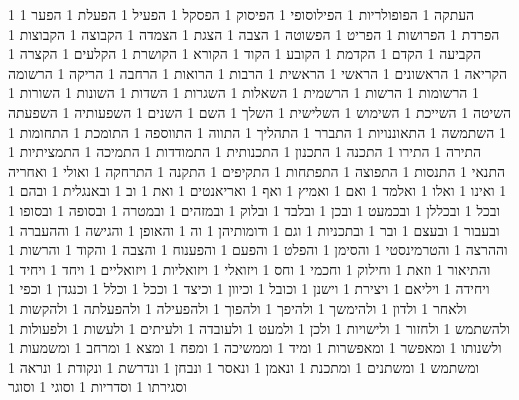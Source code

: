       1 העתקה
      1 הפופולריות
      1 הפילוסופי
      1 הפיסוק
      1 הפסקל
      1 הפעיל
      1 הפעלת
      1 הפער
      1 הפרדת
      1 הפרושות
      1 הפריט
      1 הפשוטה
      1 הצבה
      1 הצגת
      1 הצמדה
      1 הקבוצה
      1 הקבוצות
      1 הקביעה
      1 הקדם
      1 הקדמת
      1 הקובע
      1 הקוד
      1 הקורא
      1 הקושרת
      1 הקלעים
      1 הקצרה
      1 הקריאה
      1 הראשונים
      1 הראשי
      1 הראשית
      1 הרבות
      1 הרואות
      1 הרחבה
      1 הריקה
      1 הרשומה
      1 הרשומות
      1 הרשות
      1 הרשמית
      1 השאלות
      1 השגרות
      1 השדות
      1 השונות
      1 השורות
      1 השיטה
      1 השייכת
      1 השימוש
      1 השלישית
      1 השלך
      1 השם
      1 השנים
      1 השפעותיה
      1 השפעתה
      1 השתמשה
      1 התאוננויות
      1 התברר
      1 התהליך
      1 התווה
      1 התווספה
      1 התומכת
      1 התחומות
      1 התירה
      1 התירו
      1 התכנה
      1 התכנון
      1 התכנותית
      1 התמודדות
      1 התמיכה
      1 התמציתיות
      1 התנאי
      1 התנסות
      1 התפוצה
      1 התפתחות
      1 התקיפים
      1 התקנה
      1 התרחקה
      1 ואולי
      1 ואחריה
      1 ואינו
      1 ואלו
      1 ואלמד
      1 ואם
      1 ואמיץ
      1 ואף
      1 ואריאנטים
      1 ואת
      1 וב
      1 ובאנגלית
      1 ובהם
      1 ובכל
      1 ובכללן
      1 ובכמעט
      1 ובכן
      1 ובלבד
      1 ובלוק
      1 ובמזהים
      1 ובמטרה
      1 ובסופה
      1 ובסופו
      1 ובעבור
      1 ובעצם
      1 ובר
      1 ובתכניות
      1 וגם
      1 ודומותיהן
      1 וה
      1 והאופן
      1 והגישה
      1 וההעברה
      1 וההרצה
      1 והטרמינסטי
      1 והסימן
      1 והפלט
      1 והפעם
      1 והפענוח
      1 והצבה
      1 והקוד
      1 והרשות
      1 והתיאור
      1 וזאת
      1 וחילוק
      1 וחכמי
      1 וחס
      1 ויזואלי
      1 ויזואליות
      1 ויזואליים
      1 ויחד
      1 ויחיד
      1 ויחידה
      1 ויליאם
      1 ויצירת
      1 וישנן
      1 וכובל
      1 וכיוון
      1 וכיצד
      1 וככל
      1 וכלל
      1 וכנגדן
      1 וכפי
      1 ולאחר
      1 ולדון
      1 ולהימשך
      1 ולהיפך
      1 ולהפוך
      1 ולהפעילה
      1 ולהפעלתה
      1 ולהקשות
      1 ולהשתמש
      1 ולחזור
      1 ולישויות
      1 ולכן
      1 ולמעט
      1 ולעובדה
      1 ולעיתים
      1 ולעשות
      1 ולפעולות
      1 ולשנותו
      1 ומאפשר
      1 ומאפשרות
      1 ומיד
      1 וממשיכה
      1 ומפח
      1 ומצא
      1 ומרחב
      1 ומשמעות
      1 ומשתמש
      1 ומשתנים
      1 ומתכנת
      1 ונאמן
      1 ונאסר
      1 ונבחן
      1 ונדרשת
      1 ונקודת
      1 ונראה
      1 וסגירתו
      1 וסדריות
      1 וסוגי
      1 וסוגר
